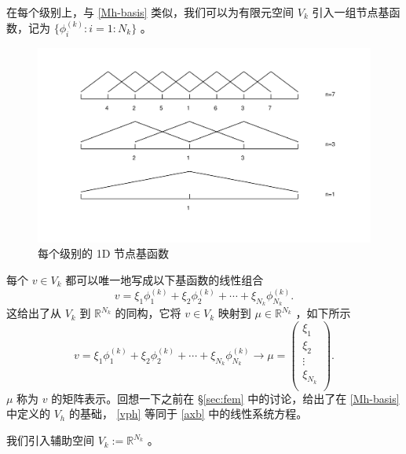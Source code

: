 \documentclass[12pt]{acta_2011xz}
\begin{document}
在每个级别上，与    \eqref{Mh-basis}    类似，我们可以为有限元空间    $V_k$    引入一组节点基函数，记为    $ \{ \phi_i^{(k)}: i=1:N_k \} $    。
   \begin{figure}[!htb]
\begin{center}
\includegraphics[width=\textwidth]{figures/1dbases}
\end{center}
\caption{每个级别的 1D 节点基函数
   \label{20150914_add1}     }
\end{figure}     

每个    $v\in V_k$    都可以唯一地写成以下基函数的线性组合
   \begin{equation}
    v=\xi_1\phi_1^{(k)}+\xi_2\phi_2^{(k)}+\cdots +\xi_{N_k}\phi_{N_k}^{(k)}.
\end{equation}    这给出了从    $V_k$    到    $\mathbb R^{N_k}$    的同构，它将    $v\in V_k$    映射到    $\mu \in \mathbb R^{N_k}$    ，如下所示
   \begin{equation}
    v=\xi_1\phi_1^{(k)}+\xi_2\phi_2^{(k)}+\cdots +
\xi_{N_k}\phi_{N_k}^{(k)} \longrightarrow \mu=\begin{pmatrix}
        \xi_1 \\ 
        \xi_2 \\ 
        \vdots \\ 
        \xi_{N_k} \\ 
    \end{pmatrix}.
\end{equation}    
   $\mu$    称为    $v$    的矩阵表示。回想一下之前在    \S       \ref{sec:fem}    中的讨论，给出了在    \eqref{Mh-basis}    中定义的    $V_h$    的基础，   \eqref{vph}    等同于    \eqref{axb}    中的线性系统方程。  

我们引入辅助空间    $V_k:=\mathbb R^{N_k}$    。  
\end{document}
